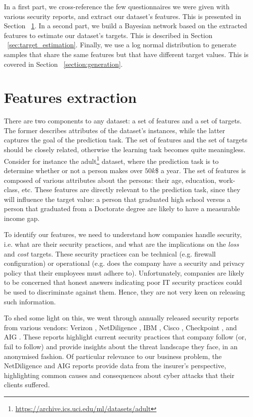 In a first part, we cross-reference the few questionnaires we were given with various security reports, and extract our dataset's features. This is presented in Section ~\ref{section:identify_feature}. In a second part, we build a Bayesian network based on the extracted features to estimate our dataset's targets. This is described in Section ~\ref{sec:target_estimation}. Finally, we use a log normal distribution to generate samples that share the same features but that have different target values. This is covered in Section ~\ref{section:generation}.  

\section{Features extraction}\label{section:identify_feature}

There are two components to any dataset: a set of features and a set of targets. The former describes attributes of the dataset's instances, while the latter captures the goal of the prediction task. The set of features and the set of targets should be closely related, otherwise the learning task becomes quite meaningless. Consider for instance the adult\footnote{\url{https://archive.ics.uci.edu/ml/datasets/adult}} dataset, where the prediction task is to determine whether or not a person makes over $50k$\$ a year. The set of features is composed of various attributes about the persons: their age, education, work-class, etc. These features are directly relevant to the prediction task, since they will influence the target value: a person that graduated high school versus a person that graduated from a Doctorate degree are likely to have a measurable income gap.


To identify our features, we need to understand how companies handle security, i.e. what are their security practices, and what are the implications on the \textit{loss} and \textit{cost} targets. These security practices can be technical (e.g. firewall configuration) or operational (e.g. does the company have a security and privacy policy that their employees must adhere to). Unfortunately, companies are likely to be concerned that honest answers indicating poor IT security practices could be used to discriminate against them. Hence, they are not very keen on releasing such information.

To shed some light on this, we went through annually released security reports from various vendors: Verizon \cite{verizon_report}, NetDiligence \cite{netdiligence_report}, IBM \cite{ibm_report}, Cisco \cite{cisco_report}, Checkpoint \cite{checkpoint_report}, and AIG \cite{aig_report}. These reports highlight current security practices that company follow (or, fail to follow) and provide insights about the threat landscape they face, in an anonymised fashion. Of particular relevance to our business problem, the NetDiligence \cite{netdiligence_report} and AIG \cite{aig_report} reports provide data from the insurer's perspective, highlighting common causes and consequences about cyber attacks that their clients suffered.

